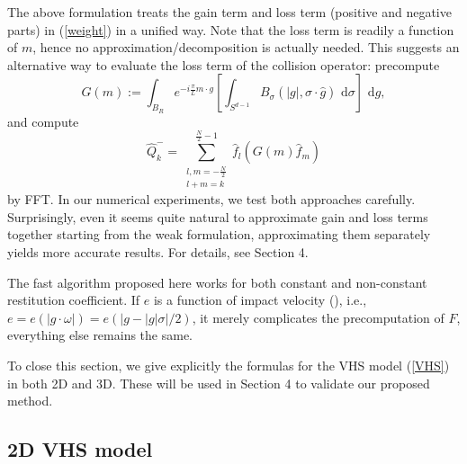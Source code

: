 \documentclass[review, times]{elsarticle}
\newcommand{\rd}{\,\mathrm{d}}
\begin{document}
The above formulation treats the gain term and loss term (positive and negative parts) in (\ref{weight}) in a unified way. Note that the loss term is readily a function of $m$, hence no approximation/decomposition is actually needed. This suggests an alternative way to evaluate the loss term of the collision operator: precompute
\begin{equation}
G(m):=\int_{B_R}e^{-i\frac{\pi}{L}m \cdot g}\left[\int_{S^{d-1}}B_{\sigma}(|g|,\sigma\cdot \hat{g})\,\rd{\sigma}\right]\,\rd{g},
\end{equation}
and compute
\begin{equation}
\hat{Q}^-_k=\sum_{\substack{l,m=-\frac{N}{2}\\l+m=k}}^{\frac{N}{2}-1}\hat{f}_l\left(G(m)\hat{f}_m\right)
\end{equation}
by FFT. In our numerical experiments, we test both approaches carefully. Surprisingly, even it seems quite natural to approximate gain and loss terms together starting from the weak formulation, approximating them separately yields more accurate results. For details, see Section 4.

\begin{rmk}
The fast algorithm proposed here works for both constant and non-constant restitution coefficient. If $e$ is a function of impact velocity (\cite{BP}), i.e., $e=e(|g\cdot \omega|)=e(|g-|g|\sigma|/2)$, it merely complicates the precomputation of $F$, everything else remains the same.
\end{rmk}

To close this section, we give explicitly the formulas for the VHS model (\ref{VHS}) in both 2D and 3D. These will be used in Section 4 to validate our proposed method. 

\subsection{2D VHS model}
\end{document}
